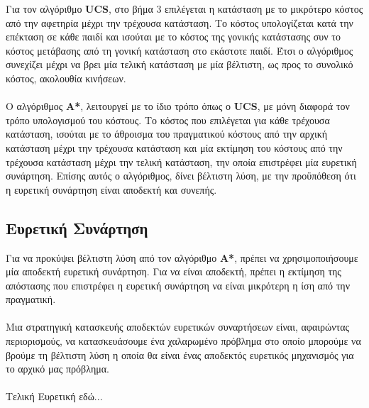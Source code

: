 \documentclass{article}
\begin{document}
        \newpage
        Για τον αλγόριθμο \textbf{UCS}, στο βήμα 3 επιλέγεται η κατάσταση με το μικρότερο κόστος από την αφετηρία μέχρι την τρέχουσα κατάσταση. Το κόστος υπολογίζεται κατά την επέκταση σε κάθε παιδί και ισούται με το κόστος της γονικής κατάστασης συν το κόστος μετάβασης από τη γονική κατάσταση στο εκάστοτε παιδί. Έτσι ο αλγόριθμος συνεχίζει μέχρι να βρει μία τελική κατάσταση με μία βέλτιστη, ως προς το συνολικό κόστος, ακολουθία κινήσεων.\\\\
        Ο αλγόριθμος \textbf{A*}, λειτουργεί με το ίδιο τρόπο όπως ο \textbf{UCS}, με μόνη διαφορά τον τρόπο υπολογισμού του κόστους. Το κόστος που επιλέγεται για κάθε τρέχουσα κατάσταση, ισούται με το άθροισμα του πραγματικού κόστους από την αρχική κατάσταση μέχρι την τρέχουσα κατάσταση και μία εκτίμηση του κόστους από την τρέχουσα κατάσταση μέχρι την τελική κατάσταση, την οποία επιστρέφει μία ευρετική συνάρτηση. Επίσης αυτός ο αλγόριθμος, δίνει βέλτιστη λύση, με την προϋπόθεση ότι η ευρετική συνάρτηση είναι αποδεκτή και συνεπής.
    
    \subsection*{Ευρετική Συνάρτηση}
        Για να προκύψει βέλτιστη λύση από τον αλγόριθμο \textbf{A*}, πρέπει να χρησιμοποιήσουμε μία αποδεκτή ευρετική συνάρτηση. Για να είναι αποδεκτή, πρέπει η εκτίμηση της απόστασης που επιστρέφει η ευρετική συνάρτηση να είναι μικρότερη η ίση από την πραγματική. \\\\
        Μια στρατηγική κατασκευής αποδεκτών ευρετικών συναρτήσεων είναι, αφαιρώντας περιορισμούς, να κατασκευάσουμε ένα χαλαρωμένο πρόβλημα στο οποίο μπορούμε να βρούμε τη βέλτιστη λύση η οποία θα είναι ένας αποδεκτός ευρετικός μηχανισμός για το αρχικό μας πρόβλημα.\\\\ 
        
        Τελική Ευρετική εδώ...
\end{document}
